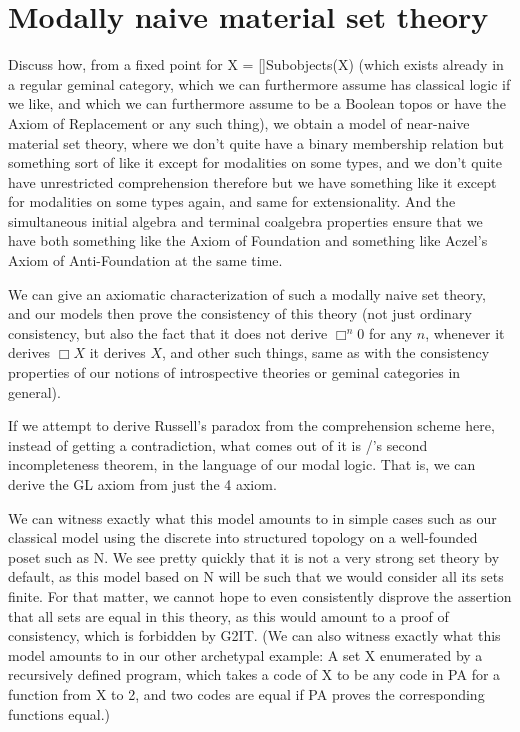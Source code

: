 \filestart

\section{Modally naive material set theory}
\begin{TODOblock}
Discuss how, from a fixed point for X = []Subobjects(X) (which exists already in a regular geminal category, which we can furthermore assume has classical logic if we like, and which we can furthermore assume to be a Boolean topos or have the Axiom of Replacement or any such thing), we obtain a model of near-naive material set theory, where we don't quite have a binary membership relation but something sort of like it except for modalities on some types, and we don't quite have unrestricted comprehension therefore but we have something like it except for modalities on some types again, and same for extensionality. And the simultaneous initial algebra and terminal coalgebra properties ensure that we have both something like the Axiom of Foundation and something like Aczel's Axiom of Anti-Foundation at the same time.

We can give an axiomatic characterization of such a modally naive set theory, and our models then prove the consistency of this theory (not just ordinary consistency, but also the fact that it does not derive $\Box^n 0$ for any $n$, whenever it derives $\Box X$ it derives $X$, and other such things, same as with the consistency properties of our notions of introspective theories or geminal categories in general).

If we attempt to derive Russell's paradox from the comprehension scheme here, instead of getting a contradiction, what comes out of it is \Goedel/'s second incompleteness theorem, in the language of our modal logic. That is, we can derive the GL axiom from just the 4 axiom.

We can witness exactly what this model amounts to in simple cases such as our classical model using the discrete into structured topology on a well-founded poset such as N. We see pretty quickly that it is not a very strong set theory by default, as this model based on N will be such that we would consider all its sets finite. For that matter, we cannot hope to even consistently disprove the assertion that all sets are equal in this theory, as this would amount to a proof of consistency, which is forbidden by G2IT. (We can also witness exactly what this model amounts to in our other archetypal example: A set X enumerated by a recursively defined program, which takes a code of X to be any code in PA for a function from X to 2, and two codes are equal if PA proves the corresponding functions equal.)


\end{TODOblock}
